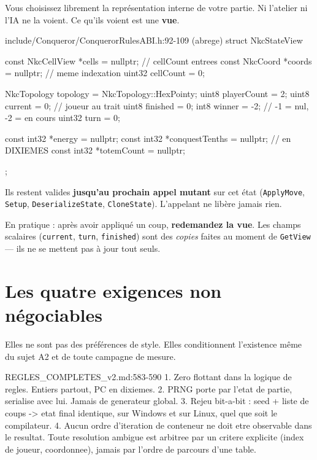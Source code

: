 Vous choisissez librement la représentation interne de votre partie. Ni l'atelier
ni l'IA ne la voient. Ce qu'ils voient est une \textbf{vue}.

\begin{nkcode}{include/Conqueror/ConquerorRulesABI.h:92-109 (abrege)}
struct NkcStateView {
        const NkcCellView *cells     = nullptr;  // cellCount entrees
        const NkcCoord    *coords    = nullptr;  // meme indexation
        uint32             cellCount = 0;

        NkcTopology topology    = NkcTopology::HexPointy;
        uint8       playerCount = 2;
        uint8       current     = 0;   // joueur au trait
        uint8       finished    = 0;
        int8        winner      = -2;  // -1 = nul, -2 = en cours
        uint32      turn        = 0;

        const int32 *energy         = nullptr;
        const int32 *conquestTenths = nullptr;   // en DIXIEMES
        const int32 *totemCount     = nullptr;
};
\end{nkcode}

\begin{nkpiege}
Ils restent valides \textbf{jusqu'au prochain appel mutant} sur cet état
(\texttt{ApplyMove}, \texttt{Setup}, \texttt{DeserializeState},
\texttt{CloneState}). L'appelant ne libère jamais rien.

En pratique : après avoir appliqué un coup, \textbf{redemandez la vue}. Les
champs scalaires (\texttt{current}, \texttt{turn}, \texttt{finished}) sont des
\emph{copies} faites au moment de \texttt{GetView} — ils ne se mettent pas à jour
tout seuls.
\end{nkpiege}

\section{Les quatre exigences non négociables}

Elles ne sont pas des préférences de style. Elles conditionnent l'existence même
du sujet A2 et de toute campagne de mesure.

\begin{nkcode}{REGLES\_COMPLETES\_v2.md:583-590}
1. Zero flottant dans la logique de regles. Entiers partout, PC en dixiemes.
2. PRNG porte par l'etat de partie, serialise avec lui. Jamais de generateur
   global.
3. Rejeu bit-a-bit : seed + liste de coups -> etat final identique, sur
   Windows et sur Linux, quel que soit le compilateur.
4. Aucun ordre d'iteration de conteneur ne doit etre observable dans le
   resultat. Toute resolution ambigue est arbitree par un critere explicite
   (index de joueur, coordonnee), jamais par l'ordre de parcours d'une table.
\end{nkcode}

